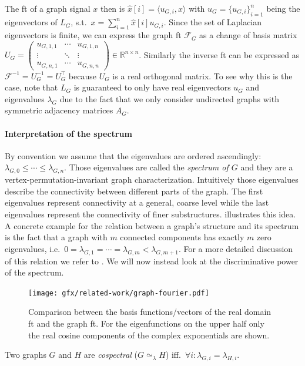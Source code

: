 The \ac{ft} of a graph signal $x$ then is $\hat{x}[i] = \langle u_{G,i}, x \rangle$ with $u_G = {\{ u_{G,i} \}}_{i=1}^{n}$ being the eigenvectors of $L_G$, s.t.\ $x = \sum_{i=1}^n \hat{x}[i] u_{G,i}$.
Since the set of Laplacian eigenvectors is finite, we can express the graph \ac{ft} $\mathcal{F}_G$ as a change of basis matrix $U_G = \begin{pmatrix} u_{G,1,1} & \cdots & u_{G,1,n} \\ \vdots & \ddots & \vdots \\ u_{G,n,1} & \cdots & u_{G,n,n} \end{pmatrix} \in \mathbb{R}^{n \times n}$.
Similarly the inverse \ac{ft} can be expressed as $\mathcal{F}^{-1} = U_G^{-1} = U_G^{\top}$ because $U_G$ is a real orthogonal matrix.
To see why this is the case, note that $L_G$ is guaranteed to only have real eigenvectors $u_G$ and eigenvalues $\lambda_G$ due to the fact that we only consider undirected graphs with symmetric adjacency matrices $A_G$.

\paragraph{Interpretation of the spectrum}
By convention we assume that the eigenvalues are ordered ascendingly: $\lambda_{G,0} \leq \cdots \leq \lambda_{G,n}$.
Those eigenvalues are called the \textit{spectrum of $G$} and they are a vertex-permutation-invariant graph characterization.
Intuitively those eigenvalues describe the connectivity between different parts of the graph.
The first eigenvalues represent connectivity at a general, coarse level while the last eigenvalues represent the connectivity of finer substructures.
 illustrates this idea.
A concrete example for the relation between a graph's structure and its spectrum is the fact that a graph with $m$ connected components has exactly $m$ zero eigenvalues, i.e.\ $0 = \lambda_{G,1} = \cdots = \lambda_{G,m} < \lambda_{G,m+1}$.
For a more detailed discussion of this relation we refer to \citet{Das2004}.
We will now instead look at the discriminative power of the spectrum.
\begin{figure}[ht]
	\centering
	\texttt{[image: gfx/related-work/graph-fourier.pdf]}
	\caption[Comparison between the basis vectors of the real domain \acl{ft} and the graph \acl{ft}.]{
		Comparison between the basis functions/vectors of the real domain \ac{ft} and the graph \ac{ft}.
		For the eigenfunctions on the upper half only the real cosine components of the complex exponentials are shown.
	}\label{fig:related:graph-fourier}
\end{figure}
\begin{defn}\label{defn:related:cospectral}
	Two graphs $G$ and $H$ are \textit{cospectral} ($G \mathrel{\simeq_\lambda} H$) iff.\ $\forall i: \lambda_{G,i} = \lambda_{H,i}$.
\end{defn}

